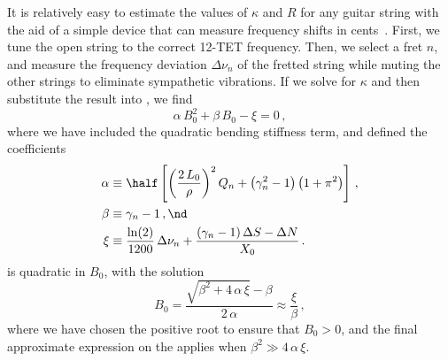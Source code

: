 It is relatively easy to estimate the values of $\kappa$ and $R$ for any guitar string with the aid of a simple device that can measure frequency shifts in cents~\cite{ref:pgtweb}. First, we tune the open string to the correct 12-TET frequency. Then, we select a fret $n$, and measure the frequency deviation $\Delta \nu_n$ of the fretted string while muting the other strings to eliminate sympathetic vibrations. If we solve  for $\kappa$ and then substitute the result into , we find
\begin{equation} \label{eqn:root_kappa_quad}
  \alpha\, B_0^2 + \beta\, B_0 - \xi = 0\, ,
\end{equation}
where we have included the quadratic bending stiffness term, and defined the coefficients
\begin{subequations}
  \begin{align}
    \alpha &\equiv \half \left[ \left(\frac{2\, L_0}{\rho}\right)^2 Q_n + \left(\gamma_n^2 - 1\right)\left(1 + \pi^2\right) \right]\, , \\
    \beta &\equiv \gamma_n - 1\, , \nd \\
    \xi &\equiv \frac{\ln(2)}{1200}\, \Delta \nu_n + \frac{\left(\gamma_n - 1\right) \Delta S - \Delta N}{X_0}\, .
\end{align}
\end{subequations}
 is quadratic in $B_0$, with the solution
 \begin{equation} \label{eqn:root_kappa_soln}
B_0 = \frac{\sqrt{\beta^2 + 4\, \alpha\, \xi} - \beta}{2\, \alpha} \approx \frac{\xi}{\beta}\, ,
 \end{equation}
where we have chosen the positive root to ensure that $B_0 > 0$, and the final approximate expression on the \rhs applies when $\beta^2 \gg 4\, \alpha\, \xi$.

